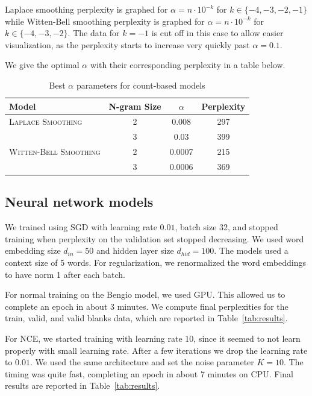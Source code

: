 \documentclass[11pt]{article}
\begin{document}
Laplace smoothing perplexity is graphed for $\alpha = n \cdot 10^{-k}$ for $k \in \{-4, -3, -2, -1\}$ while Witten-Bell smoothing perplexity is graphed for $\alpha = n \cdot 10^{-k}$ for $k \in \{-4, -3, -2\}$. The data for $k = -1$ is cut off in this case to allow easier visualization, as the perplexity starts to increase very quickly past $\alpha = 0.1$.  

We give the optimal $\alpha$ with their corresponding perplexity in a table below. 

\begin{table}[h]
  \centering
  \begin{tabular}{lccc}
    \toprule
    Model & N-gram Size & $\alpha$ & Perplexity \\
    \midrule
    \textsc{Laplace Smoothing} & 2 & 0.008 & 297 \\
    & 3 & 0.03 & 399 \\
    \textsc{Witten-Bell Smoothing} & 2 & 0.0007 & 215 \\
    & 3 & 0.0006 & 369 \\
    \bottomrule
  \end{tabular}
  \caption{\label{tab:alpha} Best $\alpha$ parameters for count-based models}
\end{table}

\subsection{Neural network models}

We trained using SGD with learning rate $0.01$, batch size 32, and stopped training when perplexity on the validation set stopped decreasing. We used word embedding size $d_{in} = 50$ and hidden layer size $d_{hid} = 100$. The models used a context size of 5 words. For regularization, we renormalized the word embeddings to have norm 1 after each batch.

For normal training on the Bengio model, we used GPU. This allowed us to complete an epoch in about 3 minutes. We compute final perplexities for the train, valid, and valid blanks data, which are reported in Table~\ref{tab:results}.

For NCE, we started training with learning rate $10$, since it seemed to not learn properly with small learning rate. After a few iterations we drop the learning rate to $0.01$. We used the same architecture and set the noise parameter $K = 10$. The timing was quite fast, completing an epoch in about 7 minutes on CPU. Final results are reported in Table~\ref{tab:results}.
\end{document}
